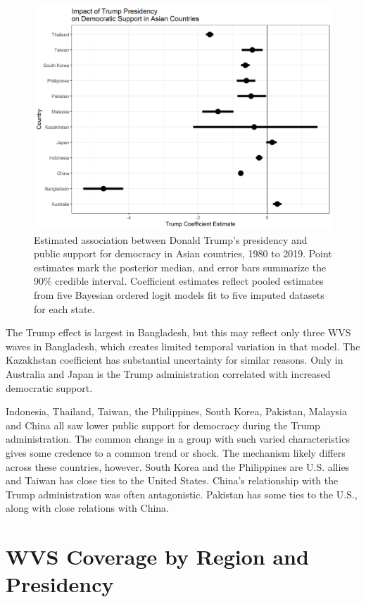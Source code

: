 \documentclass[12pt]{article}
\begin{document}
\begin{figure}
\includegraphics[width = .95\textwidth]{asia-state-trump.png}
\caption{Estimated association between Donald Trump's presidency and public support for democracy in Asian countries, 1980 to 2019. Point estimates mark the posterior median, and error bars summarize the 90\% credible interval. Coefficient estimates reflect pooled estimates from five Bayesian ordered logit models fit to five imputed datasets for each state.}
\label{fig:asia-state-trump} 
\end{figure}


The Trump effect is largest in Bangladesh, but this may reflect only three WVS waves in Bangladesh, which creates limited temporal variation in that model. 
The Kazakhstan coefficient has substantial uncertainty for similar reasons. 
Only in Australia and Japan is the Trump administration correlated with increased democratic support. 


Indonesia, Thailand, Taiwan, the Philippines, South Korea, Pakistan, Malaysia and China all saw lower public support for democracy during the Trump administration. 
The common change in a group with such varied characteristics gives some credence to a common trend or shock. 
The mechanism likely differs across these countries, however. 
South Korea and the Philippines are U.S. allies and Taiwan has close ties to the United States. 
China's relationship with the Trump administration was often antagonistic. 
Pakistan has some ties to the U.S., along with close relations with China. 


\newpage


\section{WVS Coverage by Region and Presidency}
\end{document}

